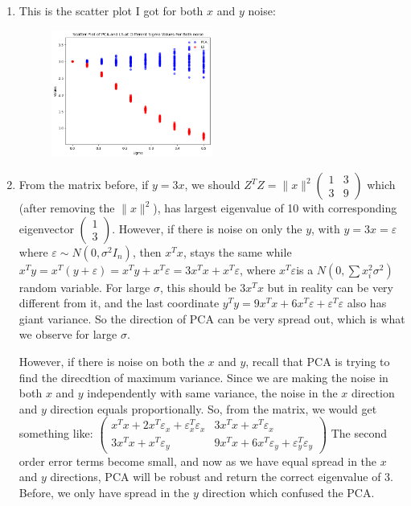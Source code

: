 \documentclass[12pt]{article}
\theoremstyle{definitionstyle}
\def \ve{\varepsilon}
\newcommand{\mg}[1]{\| #1 \|}
\begin{document}
\begin{enumerate}[leftmargin=\labelsep]
\begin{enumerate}[label=(\alph*)]
            \item This is the scatter plot I got for both $x$ and $y$ noise:
            \begin{figure}[H]
                \centering
                \includegraphics[width=0.5\textwidth]{x_y_noise.png}
            \end{figure}

            \item From the matrix before, if $y = 3x$, we should $Z^TZ = \mg{x}^2\begin{pmatrix}
                1 & 3 \\
                3 & 9
            \end{pmatrix}$ which (after removing the $\mg{x}^2$), has largest eigenvalue of 10 with corresponding eigenvector $\begin{pmatrix}
                1 \\ 3
            \end{pmatrix}$. However, if there is noise on only the $y$, with $y = 3x = \ve$ where $\ve \sim N(0, \sigma^2 I_n)$, then $x^Tx$, stays the same while $x^Ty = x^T(y + \ve) = x^Ty + x^T\ve = 3x^Tx + x^T\ve$, where $x^T \ve $is a $N(0, \sum x_i^2 \sigma^2)$ random variable. For large $\sigma$, this should be $3x^Tx$ but in reality can be very different from it, and the last coordinate $y^Ty = 9x^Tx + 6x^T \ve + \ve^T\ve$ also has giant variance. So the direction of PCA can be very spread out, which is what we observe for large $\sigma$.

            However, if there is noise on both the $x$ and $y$, recall that PCA is trying to find the direcdtion of maximum variance. Since we are making the noise in both $x$ and $y$ independently with same variance, the noise in the $x$ direction and $y$ direction equals proportionally. So, from the matrix, we would get something like: $\begin{pmatrix}
                x^Tx + 2x^T \ve_x + \ve_x^T\ve_x & 3x^Tx + x^T \ve_x \\ 
                3x^Tx + x^T \ve_y & 9x^Tx + 6x^T\ve_y + \ve_y^T\ve_y
            \end{pmatrix}$
            The second order error terms become small, and now as we have equal spread in the $x$ and $y$ directions, PCA will be robust and return the correct eigenvalue of $3$. Before, we only have spread in the $y$ direction which confused the PCA.


\end{enumerate}
\end{enumerate}
\end{document}
